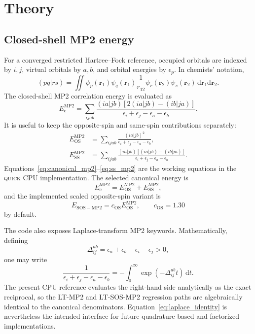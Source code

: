\documentclass[aip,jcp,reprint,superscriptaddress]{revtex4-2}
\newcommand{\quick}{\textsc{quick}}
\newcommand{\dd}{\mathrm{d}}
\newcommand{\EMPtwo}{E_{\mathrm{c}}^{\mathrm{MP2}}}
\begin{document}
\section{Theory}

\subsection{Closed-shell MP2 energy}

For a converged restricted Hartree--Fock reference, occupied orbitals are indexed by \(i,j\), virtual orbitals by \(a,b\), and orbital energies by \(\epsilon_p\).  In chemists' notation,
\begin{equation}
  (pq|rs)
  =
  \iint
  \psi_p(\mathbf{r}_1)\psi_q(\mathbf{r}_1)
  \frac{1}{r_{12}}
  \psi_r(\mathbf{r}_2)\psi_s(\mathbf{r}_2)
  \,\dd\mathbf{r}_1\dd\mathbf{r}_2 .
\end{equation}
The closed-shell MP2 correlation energy is evaluated as
\begin{equation}
  \EMPtwo
  =
  \sum_{ijab}
  \frac{(ia|jb)\left[2(ia|jb)-(ib|ja)\right]}
       {\epsilon_i+\epsilon_j-\epsilon_a-\epsilon_b}.
  \label{eq:canonical_mp2}
\end{equation}
It is useful to keep the opposite-spin and same-spin contributions separately:
\begin{align}
  E_{\mathrm{OS}}^{\mathrm{MP2}}
  &=
  \sum_{ijab}
  \frac{(ia|jb)^2}
       {\epsilon_i+\epsilon_j-\epsilon_a-\epsilon_b},
  \label{eq:os_mp2}\\
  E_{\mathrm{SS}}^{\mathrm{MP2}}
  &=
  \sum_{ijab}
  \frac{(ia|jb)\left[(ia|jb)-(ib|ja)\right]}
       {\epsilon_i+\epsilon_j-\epsilon_a-\epsilon_b}.
  \label{eq:ss_mp2}
\end{align}
Equations~\eqref{eq:canonical_mp2}--\eqref{eq:ss_mp2} are the working equations in the \quick{} CPU implementation.  The selected canonical energy is
\begin{equation}
  \EMPtwo=E_{\mathrm{OS}}^{\mathrm{MP2}}+E_{\mathrm{SS}}^{\mathrm{MP2}},
\end{equation}
and the implemented scaled opposite-spin variant is
\begin{equation}
  E_{\mathrm{SOS-MP2}} = c_{\mathrm{OS}}E_{\mathrm{OS}}^{\mathrm{MP2}},
  \qquad c_{\mathrm{OS}}=1.30
\end{equation}
by default.

The code also exposes Laplace-transform MP2 keywords.  Mathematically, defining
\begin{equation}
  \Delta_{ij}^{ab}=\epsilon_a+\epsilon_b-\epsilon_i-\epsilon_j>0,
\end{equation}
one may write
\begin{equation}
  \frac{1}{\epsilon_i+\epsilon_j-\epsilon_a-\epsilon_b}
  =
  -\int_0^\infty
  \exp(-\Delta_{ij}^{ab}t)\,\dd t .
  \label{eq:laplace_identity}
\end{equation}
The present CPU reference evaluates the right-hand side analytically as the exact reciprocal, so the LT-MP2 and LT-SOS-MP2 regression paths are algebraically identical to the canonical denominators.  Equation~\eqref{eq:laplace_identity} is nevertheless the intended interface for future quadrature-based and factorized implementations.
\end{document}
